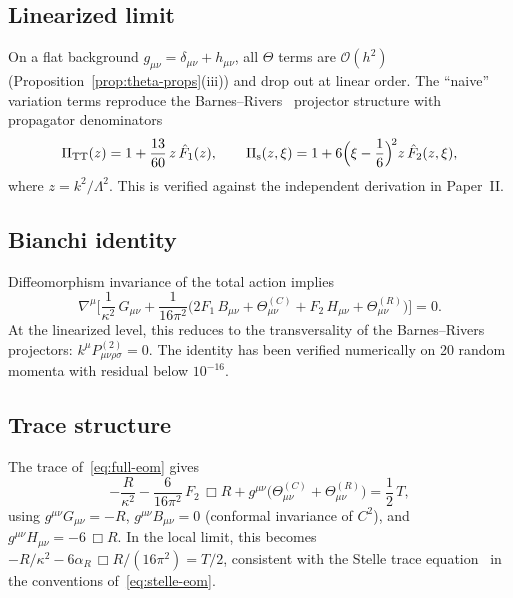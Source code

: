 \documentclass[12pt,a4paper]{article}
\newcommand{\PiTT}{\Pi_{\mathrm{TT}}}
\newcommand{\Pis}{\Pi_{\mathrm{s}}}
\newcommand{\order}{\mathcal{O}}
\newcommand{\Lam}{\Lambda}
\theoremstyle{plain}
\theoremstyle{definition}
\begin{document}
\subsection{Linearized limit}
\label{sec:linearized-limit-check}

On a flat background $g_{\mu\nu} = \delta_{\mu\nu} + h_{\mu\nu}$, all
$\Theta$ terms are $\order(h^2)$ (Proposition~\ref{prop:theta-props}(iii))
and drop out at linear order.  The ``naive'' variation terms reproduce the
Barnes--Rivers~\cite{Barnes:1965,Rivers:1964} projector structure with
propagator denominators
\begin{equation}\label{eq:propagator-denominators}
  \PiTT(z) = 1 + \frac{13}{60}\,z\,\hat{F}_1(z),
  \qquad
  \Pis(z,\xi) = 1 + 6\Bigl(\xi - \frac{1}{6}\Bigr)^{\!2}
  z\,\hat{F}_2(z,\xi),
\end{equation}
where $z = k^2/\Lam^2$.  This is verified against the independent
derivation in Paper~II.

\subsection{Bianchi identity}

Diffeomorphism invariance of the total action implies
\begin{equation}\label{eq:bianchi}
  \nabla^\mu\biggl[\frac{1}{\kappa^2}\,G_{\mu\nu}
  + \frac{1}{16\pi^2}\bigl(2F_1\,B_{\mu\nu}
  + \Theta^{(C)}_{\mu\nu}
  + F_2\,H_{\mu\nu}
  + \Theta^{(R)}_{\mu\nu}\bigr)\biggr] = 0.
\end{equation}
At the linearized level, this reduces to the transversality of the
Barnes--Rivers projectors: $k^\mu P^{(2)}_{\mu\nu\rho\sigma} = 0$.
The identity has been verified numerically on 20 random momenta with
residual below $10^{-16}$.

\subsection{Trace structure}

The trace of~\eqref{eq:full-eom} gives
\begin{equation}\label{eq:trace}
  -\frac{R}{\kappa^2}
  - \frac{6}{16\pi^2}\,F_2\,\Box R
  + g^{\mu\nu}\bigl(\Theta^{(C)}_{\mu\nu}
  + \Theta^{(R)}_{\mu\nu}\bigr)
  = \frac{1}{2}\,T,
\end{equation}
using $g^{\mu\nu}G_{\mu\nu} = -R$, $g^{\mu\nu}B_{\mu\nu} = 0$
(conformal invariance of $C^2$), and
$g^{\mu\nu}H_{\mu\nu} = -6\,\Box R$.  In the local limit, this becomes
$-R/\kappa^2 - 6\alpha_R\,\Box R/(16\pi^2) = T/2$, consistent with the Stelle trace
equation~\cite{Stelle:1976gc} in the conventions of~\eqref{eq:stelle-eom}.
\end{document}
